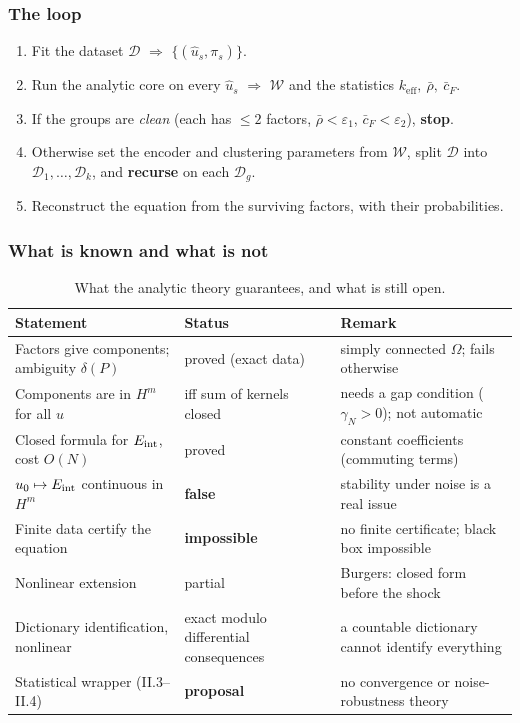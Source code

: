 \subsubsection{The loop}\label{sec:loop}
\begin{ideabox}[title={Algorithm (outer loop)}]
\begin{enumerate}[nosep,leftmargin=*]
\item Fit the dataset $\mathcal D$ $\Rightarrow$ $\{(\hat u_s,\pi_s)\}$.
\item Run the analytic core on every $\hat u_s$ $\Rightarrow$ $\mathcal W$ and the statistics $k_{\mathrm{eff}},\ \bar\rho,\ \bar c_F$.
\item If the groups are \emph{clean} (each has $\le2$ factors, $\bar\rho<\varepsilon_1$, $\bar c_F<\varepsilon_2$), \textbf{stop}.
\item Otherwise set the encoder and clustering parameters from $\mathcal W$, split $\mathcal D$ into $\mathcal D_1,\dots,\mathcal D_k$, and \textbf{recurse} on each $\mathcal D_g$.
\item Reconstruct the equation from the surviving factors, with their probabilities.
\end{enumerate}
\end{ideabox}

\subsubsection{What is known and what is not}
\begin{table}[!htb]
\centering\small
\begin{tabular}{@{}p{5.2cm}p{3.2cm}p{5.5cm}@{}}
\toprule
Statement & Status & Remark\\\midrule
Factors give components; ambiguity $\delta(P)$ & proved (exact data) & simply connected $\Omega$; fails otherwise\\
Components are in $H^m$ for all $u$ & iff sum of kernels closed & needs a gap condition ($\gamma_N>0$); not automatic\\
Closed formula for $E_{\mathrm{int}}$, cost $O(N)$ & proved & constant coefficients (commuting terms)\\
$u_0\mapsto E_{\mathrm{int}}$ continuous in $H^m$ & \textbf{false} & stability under noise is a real issue\\
Finite data certify the equation & \textbf{impossible} & no finite certificate; black box impossible\\
Nonlinear extension & partial & Burgers: closed form before the shock\\
Dictionary identification, nonlinear & exact modulo differential consequences & a countable dictionary cannot identify everything\\
Statistical wrapper (II.3--II.4) & \textbf{proposal} & no convergence or noise-robustness theory\\
\bottomrule
\end{tabular}
\caption{What the analytic theory guarantees, and what is still open.}
\end{table}

